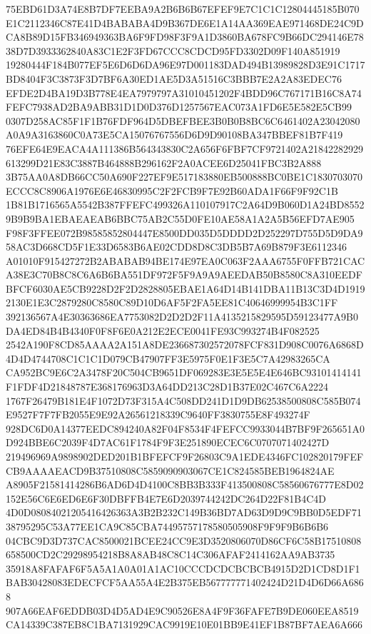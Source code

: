 \documentclass[UTF8,fontset=fandol,zihao=-4,a4paper]{ctexart}
\begin{document}
{{75EBD61D3A74E8B7DF7EEBA9A2B6B6B67EFEF9E7C1C1C12804445185B070E1C2112346C87E41D4BABABA4D9B367DE6E1A14AA369EAE971468DE24C9D
CA8B89D15FB346949363BA6F9FD98F3F9A1D3860BA678FC9B66DC294146E7838D7D3933362840A83C1E2F3FD67CCC8CDCD95FD3302D09F140A851919
19280444F184B077EF5E6D6D6DA96E97D001183DAD494B13989828D3E91C1717BD8404F3C3873F3D7BF6A30ED1AE5D3A51516C3BBB7E2A2A83EDEC76
EFDE2D4BA19D3B778E4EA7979797A31010451202F4BDD96C767171B16C8A74FEFC7938AD2BA9ABB31D1D0D376D1257567EAC073A1FD6E5E582E5CB99
0307D258AC85F1F1B76FDF964D5DBEFBEE3B0B0B8BC6C6461402A23042080A0A9A3163860C0A73E5CA15076767556D6D9D90108BA347BBEF81B7F419
76EFE64E9EACA4A111386B564343830C2A656F6FBF7CF9721402A21842282929613299D21E83C3887B464888B296162F2A0ACEE6D25041FBC3B2A888
3B75AA0A8DB66CC50A690F227EF9E517183880EB500888BC0BE1C1830703070ECCC8C8906A1976E6E46830995C2F2FCB9F7E92B60ADA1F66F9F92C1B
1B81B1716565A5542B387FFEFC499326A110107917C2A64D9B060D1A24BD85529B9B9BA1EBAEAEAB6BBC75AB2C55D0FE10AE58A1A2A5B56EFD7AE905
F98F3FFEE072B98585852804447E8500DD035D5DDDD2D252297D755D5D9DA958AC3D668CD5F1E33D6583B6AE02CDD8D8C3DB5B7A69B879F3E6112346
A01010F915427272B2ABABAB94BE174E97EA0C063F2AAA6755F0FFB721CACA38E3C70B8C8C6A6B6BA551DF972F5F9A9A9AEEDAB50B8580C8A310EEDF
BFCF6030AE5CB9228D2F2D2828805EBAE1A64D14B141DBA11B13C3D4D19192130E1E3C2879280C8580C89D10D6AF5F2FA5EE81C40646999954B3C1FF
392136567A4E30363686EA7753082D2D2D2F11A4135215829595D59123477A9B0DA4ED84B4B4340F0F8F6E0A212E2ECE0041FE93C993274B4F082525
2542A190F8CD85AAAA2A151A8DE236687302572078FCF831D908C0076A6868D4D4D4744708C1C1C1D079CB47907FF3E5975F0E1F3E5C7A42983265CA
CA952BC9E6C2A3478F20C504CB9651DF069283E3E5E5E4E646BC93101414141F1FDF4D21848787E368176963D3A64DD213C28D1B37E02C467C6A2224
1767F26479B181E4F1072D73F315A4C508DD241D1D9DB62538500808C585B074E9527F7F7FB2055E9E92A26561218339C9640FF3830755E8F493274F
928DC6D0A14377EEDC894240A82F04F8534F4FEFCC9933044B7BF9F265651A0D924BBE6C2039F4D7AC61F1784F9F3E251890ECEC6C0707071402427D
219496969A9898902DED201B1BFEFCF9F26803C9A1EDE4346FC102820179FEFCB9AAAAEACD9B37510808C5859090903067CE1C824585BEB1964824AE
A8905F21581414286B6AD6D4D4100C8BB3B333F413500808C58560676777E8D02152E56C6E6ED6E6F30DBFFB4E7E6D2039744242DC264D22F81B4C4D
4D0D08084021205416426363A3B2B232C149B36BD7AD63D9D9C9BB0D5EDF7138795295C53A77EE1CA9C85CBA74495757178580505908F9F9F9B6B6B6
04CBC9D3D737CAC8500021BCEE24CC9E3D3520806070D86CF6C58B17510808658500CD2C29298954218B8A8AB48C8C14C306AFAF2414162AA9AB3735
35918A8FAFAF6F5A5A1A0A01A1AC10CCCDCDCBCBCB4915D2D1CD8D1F1BAB30428083EDECFCF5AA55A4E2B375EB567777771402424D21D4D6D66A6868
907A66EAF6EDDB03D4D5AD4E9C90526E8A4F9F36FAFE7B9DE060EEA8519CA14339C387EB8C1BA7131929CAC9919E10E01BB9E41EF1B87BF7AEA6A666
}}
\end{document}
